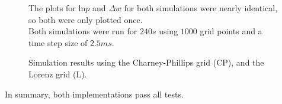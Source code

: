 \begin{figure}[!h]
    \caption{Simulation results using the Charney-Phillips grid (CP), and the Lorenz grid (L).}
    \label{fig:simulations}
    \small
The plots for $\text{ln}p$ and $\Delta w$ for both simulations were nearly identical, so both were only plotted once.\\
Both simulations were run for $240s$ using $1000$ grid points and a time step size of $2.5ms$.
\end{figure}
In summary, both implementations pass all tests.



